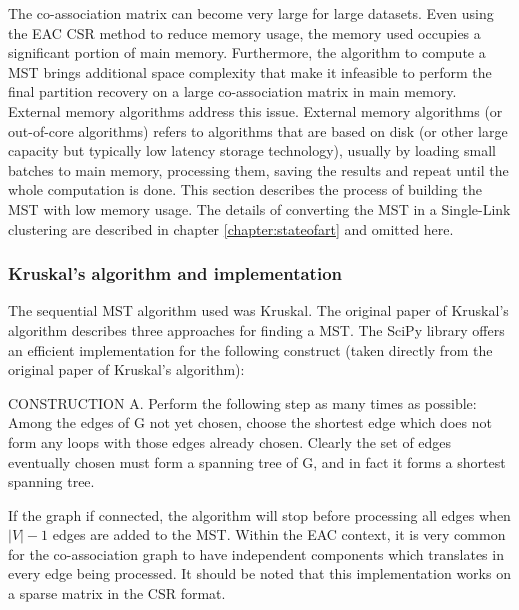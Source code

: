 The co-association matrix can become very large for large datasets.
Even using the EAC CSR method to reduce memory usage, the memory used occupies a significant portion of main memory.
Furthermore, the algorithm to compute a MST brings additional space complexity that make it infeasible to perform the final partition recovery on a large co-association matrix in main memory.
External memory algorithms address this issue.
External memory algorithms (or out-of-core algorithms) refers to algorithms that are based on disk (or other large capacity but typically low latency storage technology), usually by loading small batches to main memory, processing them, saving the results and repeat until the whole computation is done.
This section describes the process of building the MST with low memory usage.
The details of converting the MST in a Single-Link clustering are described in chapter \ref{chapter:stateofart} and omitted here.

\subsubsection{Kruskal's algorithm and implementation}

The sequential MST algorithm used was Kruskal.
The original paper of Kruskal's \cite{kruskal1956shortest} algorithm describes three approaches for finding a MST.
The SciPy library offers an efficient implementation for the following construct (taken directly from the original paper of Kruskal's algorithm):
\begin{displayquote}
CONSTRUCTION A. Perform the following step as many times as possible: Among the edges of G not yet chosen, choose the shortest edge which does not form any loops with those edges already chosen. Clearly the set of edges eventually chosen must form a spanning tree of G, and in fact it forms a shortest spanning tree.
\end{displayquote}
If the graph if connected, the algorithm will stop before processing all edges when $|V| - 1$ edges are added to the MST.
Within the EAC context, it is very common for the co-association graph to have independent components which translates in every edge being processed.
It should be noted that this implementation works on a sparse matrix in the CSR format.

